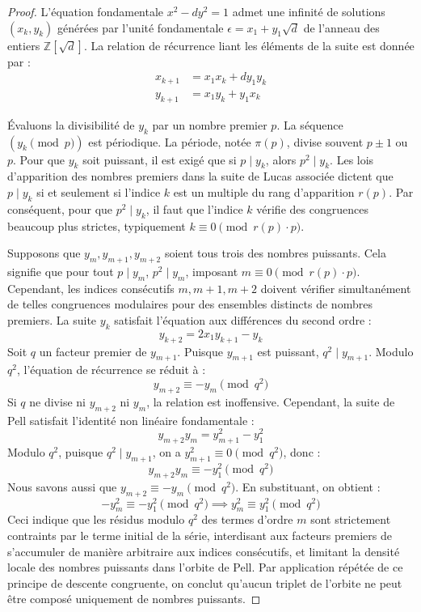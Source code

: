 \documentclass[11pt,a4paper]{article}
\begin{document}
\begin{proof}
L'équation fondamentale $x^2 - dy^2 = 1$ admet une infinité de solutions $(x_k, y_k)$ générées par l'unité fondamentale $\epsilon = x_1 + y_1 \sqrt{d}$ de l'anneau des entiers $\mathbb{Z}[\sqrt{d}]$.
La relation de récurrence liant les éléments de la suite est donnée par :
\begin{align}
x_{k+1} &= x_1 x_k + d y_1 y_k \\
y_{k+1} &= x_1 y_k + y_1 x_k
\end{align}

Évaluons la divisibilité de $y_k$ par un nombre premier $p$. La séquence $(y_k \pmod p)$ est périodique. La période, notée $\pi(p)$, divise souvent $p \pm 1$ ou $p$.
Pour que $y_k$ soit puissant, il est exigé que si $p \mid y_k$, alors $p^2 \mid y_k$.
Les lois d'apparition des nombres premiers dans la suite de Lucas associée dictent que $p \mid y_k$ si et seulement si l'indice $k$ est un multiple du rang d'apparition $r(p)$.
Par conséquent, pour que $p^2 \mid y_k$, il faut que l'indice $k$ vérifie des congruences beaucoup plus strictes, typiquement $k \equiv 0 \pmod{r(p) \cdot p}$.

Supposons que $y_m, y_{m+1}, y_{m+2}$ soient tous trois des nombres puissants.
Cela signifie que pour tout $p \mid y_m$, $p^2 \mid y_m$, imposant $m \equiv 0 \pmod{r(p) \cdot p}$.
Cependant, les indices consécutifs $m, m+1, m+2$ doivent vérifier simultanément de telles congruences modulaires pour des ensembles distincts de nombres premiers.
La suite $y_k$ satisfait l'équation aux différences du second ordre :
\begin{equation}
y_{k+2} = 2x_1 y_{k+1} - y_k
\end{equation}
Soit $q$ un facteur premier de $y_{m+1}$. Puisque $y_{m+1}$ est puissant, $q^2 \mid y_{m+1}$.
Modulo $q^2$, l'équation de récurrence se réduit à :
\begin{equation}
y_{m+2} \equiv - y_m \pmod{q^2}
\end{equation}
Si $q$ ne divise ni $y_{m+2}$ ni $y_m$, la relation est inoffensive.
Cependant, la suite de Pell satisfait l'identité non linéaire fondamentale :
\begin{equation}
y_{m+2} y_m = y_{m+1}^2 - y_1^2
\end{equation}
Modulo $q^2$, puisque $q^2 \mid y_{m+1}$, on a $y_{m+1}^2 \equiv 0 \pmod{q^2}$, donc :
\begin{equation}
y_{m+2} y_m \equiv - y_1^2 \pmod{q^2}
\end{equation}
Nous savons aussi que $y_{m+2} \equiv - y_m \pmod{q^2}$. En substituant, on obtient :
\begin{equation}
- y_m^2 \equiv - y_1^2 \pmod{q^2} \implies y_m^2 \equiv y_1^2 \pmod{q^2}
\end{equation}
Ceci indique que les résidus modulo $q^2$ des termes d'ordre $m$ sont strictement contraints par le terme initial de la série, interdisant aux facteurs premiers de s'accumuler de manière arbitraire aux indices consécutifs, et limitant la densité locale des nombres puissants dans l'orbite de Pell.
Par application répétée de ce principe de descente congruente, on conclut qu'aucun triplet de l'orbite ne peut être composé uniquement de nombres puissants.
\end{proof}
\end{document}
